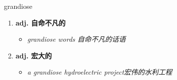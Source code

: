 
\begin{frame}
{\huge grandiose}
\begin{center}
\begin{enumerate}\Large
  \item \textbf{adj. 自命不凡的}
  \begin{itemize}
    \item \em{\Large{grandiose words 自命不凡的话语}}
  \end{itemize}
  \item \textbf{adj. 宏大的}
  \begin{itemize}
    \item \em{\Large{a grandiose hydroelectric project宏伟的水利工程}}
  \end{itemize}
\end{enumerate}
\end{center}
\end{frame}
